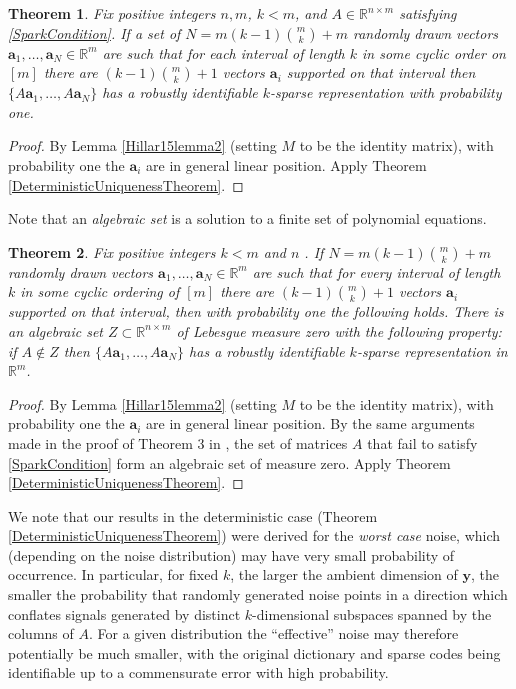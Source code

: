 \documentclass[journal, twocolumn]{IEEEtran}
\newtheorem{theorem}{Theorem}
\begin{document}
\begin{theorem}\label{Theorem2}
Fix positive integers $n, m$, $k < m$, and $A \in \mathbb{R}^{n \times m}$ satisfying \eqref{SparkCondition}. If a set of $N = m(k-1){m \choose k}+m$ randomly drawn vectors $\mathbf{a}_1, \ldots, \mathbf{a}_N \in \mathbb{R}^m$ are such that for each interval of length $k$ in some cyclic order on $[m]$ there are $(k-1){m \choose k} + 1$ vectors $\mathbf{a}_i$ supported on that interval then $\{A\mathbf{a}_1, \ldots, A\mathbf{a}_N\}$ has a robustly identifiable $k$-sparse representation with probability one.
\end{theorem}

\begin{proof}
By Lemma \ref{Hillar15lemma2} (setting $M$ to be the identity matrix), with probability one the $\mathbf{a}_i$ are in general linear position. Apply Theorem \ref{DeterministicUniquenessTheorem}.
\end{proof} 

Note that an \emph{algebraic set} is a solution to a finite set of polynomial equations. 

\begin{theorem}\label{Theorem3}
Fix positive integers $k < m$ and $n$ . If $N = m(k-1){m \choose k}+m$ randomly drawn vectors $\mathbf{a}_1, \ldots, \mathbf{a}_N \in \mathbb{R}^m$ are such that for every interval of length $k$ in some cyclic ordering of $[m]$ there are $(k-1){m \choose k}+1$ vectors $\mathbf{a}_i$ supported on that interval, then with probability one the following holds. There is an algebraic set $Z \subset \mathbb{R}^{n \times m}$ of Lebesgue measure zero with the following property: if $A \notin Z$ then $\{A\mathbf{a}_1, \ldots , A\mathbf{a}_N \}$ has a robustly identifiable $k$-sparse representation in $\mathbb{R}^m$.
\end{theorem}

\begin{proof}
By Lemma \ref{Hillar15lemma2} (setting $M$ to be the identity matrix), with probability one the $\mathbf{a}_i$ are in general linear position. By the same arguments made in the proof of Theorem 3 in \cite{Hillar15}, the set of matrices $A$ that fail to satisfy \eqref{SparkCondition} form an algebraic set of measure zero. Apply Theorem \ref{DeterministicUniquenessTheorem}.
\end{proof}

We note that our results in the deterministic case (Theorem \ref{DeterministicUniquenessTheorem}) were derived for the \emph{worst case} noise, which (depending on the noise distribution) may have very small probability of occurrence. In particular, for fixed $k$, the larger the ambient dimension of $\mathbf{y}$, the smaller the probability that randomly generated noise points in a direction which conflates signals generated by distinct $k$-dimensional subspaces spanned by the columns of $A$. For a given distribution the ``effective'' noise may therefore potentially be much smaller, with the original dictionary and sparse codes being identifiable up to a commensurate error with high probability. 
\end{document}
